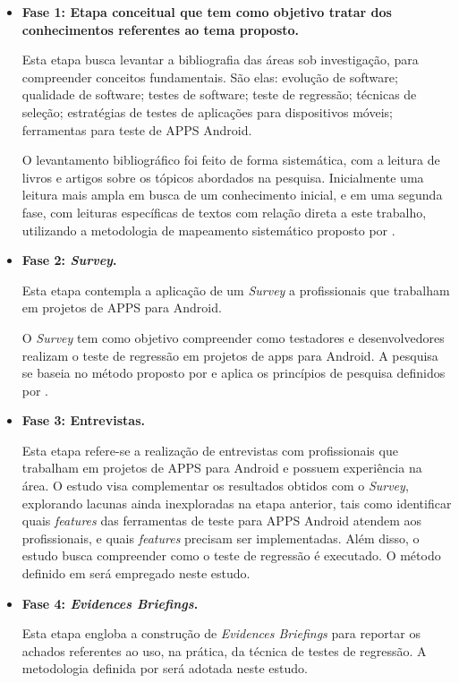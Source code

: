 \begin{itemize}
  \item \textbf{Fase 1: Etapa conceitual que tem como objetivo tratar dos conhecimentos referentes ao tema proposto.}
  
  Esta etapa busca levantar a bibliografia das áreas sob investigação, para compreender conceitos fundamentais. São elas: evolução de software; qualidade de software; testes de software; teste de regressão; técnicas de seleção; estratégias de testes de aplicações para dispositivos móveis; ferramentas para teste de \ac{APPS} Android.
  
  O levantamento bibliográfico foi feito de forma sistemática, com a leitura de livros e artigos sobre os tópicos abordados na pesquisa. Inicialmente uma leitura mais ampla em busca de um conhecimento inicial, e em uma segunda fase, com leituras específicas de textos com relação direta a este trabalho, utilizando a metodologia de mapeamento sistemático proposto por .
  
  \item \textbf{Fase 2: \textit{Survey}.}
  
  Esta etapa contempla a aplicação de um \textit{Survey} a profissionais que trabalham em projetos de \ac{APPS} para Android.
  
  O \textit{Survey} tem como objetivo compreender como testadores e desenvolvedores realizam o teste de regressão em projetos de apps para Android. A pesquisa se baseia no método proposto por  e aplica os princípios de pesquisa definidos por .
 
  \item \textbf{Fase 3: Entrevistas.}
  
  Esta etapa refere-se a realização de entrevistas com profissionais que trabalham em projetos de \ac{APPS} para Android e possuem experiência na área. O estudo visa complementar os resultados obtidos com o \textit{Survey}, explorando lacunas ainda inexploradas na etapa anterior, tais como identificar quais \textit{features} das ferramentas de teste para \ac{APPS} Android atendem aos profissionais, e quais \textit{features} precisam ser implementadas. Além disso, o estudo busca compreender como o teste de regressão é executado. O método definido em  será empregado neste estudo.
  
  \item \textbf{Fase 4: \textit{Evidences Briefings}.}
  
  Esta etapa engloba a construção de \textit{Evidences Briefings} para reportar os achados referentes ao uso, na prática, da técnica de testes de regressão. A metodologia definida por  será adotada neste estudo.
  
\end{itemize}

